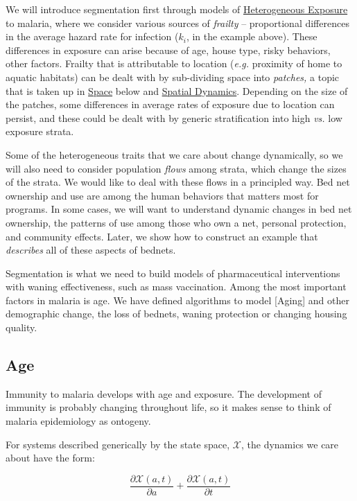 \documentclass[
]{book}
\begin{document}
We will introduce segmentation first through models of \protect\hyperlink{heterogeneous-exposure}{Heterogeneous Exposure} to malaria, where we consider various sources of \emph{frailty} -- proportional differences in the average hazard rate for infection (\(k_i\), in the example above). These differences in exposure can arise because of age, house type, risky behaviors, other factors. Frailty that is attributable to location (\emph{e.g.} proximity of home to aquatic habitats) can be dealt with by sub-dividing space into \emph{patches,} a topic that is taken up in \protect\hyperlink{space}{Space} below and \protect\hyperlink{spatial-dynamics}{Spatial Dynamics}. Depending on the size of the patches, some differences in average rates of exposure due to location can persist, and these could be dealt with by generic stratification into high \emph{vs.} low exposure strata.

Some of the heterogeneous traits that we care about change dynamically, so we will also need to consider population \emph{flows} among strata, which change the sizes of the strata. We would like to deal with these flows in a principled way. Bed net ownership and use are among the human behaviors that matters most for programs. In some cases, we will want to understand dynamic changes in bed net ownership, the patterns of use among those who own a net, personal protection, and community effects. Later, we show how to construct an example that \emph{describes} all of these aspects of bednets.

Segmentation is what we need to build models of pharmaceutical interventions with waning effectiveness, such as mass vaccination. Among the most important factors in malaria is age. We have defined algorithms to model {[}Aging{]} and other demographic change, the loss of bednets, waning protection or changing housing quality.

\hypertarget{age}{%
\subsection{Age}\label{age}}

Immunity to malaria develops with age and exposure. The development of immunity is probably changing throughout life, so it makes sense to think of malaria epidemiology as ontogeny.

For systems described generically by the state space, \(\mathscr X\), the dynamics we care about have the form:

\[\frac{\partial {\mathscr X}(a,t)}{\partial a} + \frac{\partial {\mathscr X}(a,t)}{\partial t}\]
\end{document}
